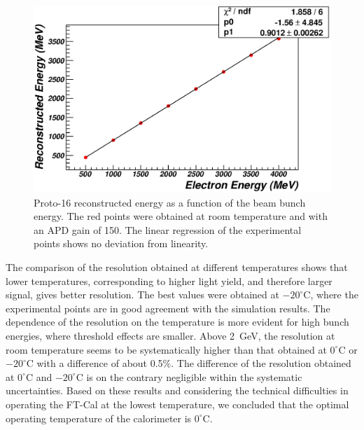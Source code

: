 \begin{figure}
\includegraphics[width=1.0\columnwidth]{fig/btf_linearity_1876_2_6.eps}
\caption{Proto-16 reconstructed energy as a function of the beam bunch energy. The red points were obtained at
  room temperature and with an APD gain of 150. The linear regression of the experimental points shows no deviation
  from linearity.}
\label{fig:btf_linearity}
\end{figure}

The comparison of the resolution obtained at different temperatures shows that lower temperatures,
corresponding to higher light yield, and therefore larger signal, gives better resolution. The best values were
obtained at $-20^{\circ}$C, where the experimental points are in good agreement with the simulation results. The
dependence of the resolution on the temperature is more evident for high bunch energies, where threshold
effects are smaller. Above 2~GeV, the resolution at room temperature seems to be systematically higher than that
obtained at $0^\circ$C or $-20^\circ$C with a difference of about 0.5\%. The difference of the resolution obtained
at $0^\circ$C and $-20^\circ$C is on the contrary negligible within the systematic uncertainties. Based
on these results and considering the technical difficulties in operating the FT-Cal at the lowest temperature, we
concluded that the optimal operating temperature of the calorimeter is $0^\circ$C.

